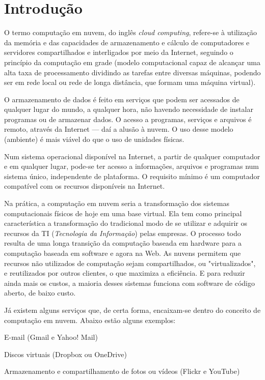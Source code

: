\section{Introdução}

O termo computação em nuvem, do inglês \emph{cloud computing}, refere-se à
utilização da memória e das capacidades de armazenamento e cálculo de
computadores e servidores compartilhados e interligados por meio da Internet,
seguindo o princípio da computação em grade (modelo computacional capaz de
alcançar uma alta taxa de processamento dividindo as tarefas entre diversas
máquinas, podendo ser em rede local ou rede de longa distância, que formam uma
máquina virtual).

O armazenamento de dados é feito em serviços que podem ser acessados de qualquer
lugar do mundo, a qualquer hora, não havendo necessidade de instalar
programas ou de armazenar dados. O acesso a programas, serviços e arquivos é
remoto, através da Internet --- daí a alusão à nuvem. O uso desse modelo (ambiente)
é mais viável do que o uso de unidades físicas.

Num sistema operacional disponível na Internet, a partir de qualquer computador e em
qualquer lugar, pode-se ter acesso a informações, arquivos e programas num sistema
único, independente de plataforma. O requisito mínimo é um computador compatível
com os recursos disponíveis na Internet.

Na prática, a computação em nuvem seria a transformação dos sistemas
computacionais físicos de hoje em uma base virtual. Ela tem como principal
característica a transformação do tradicional modo de se utilizar e adquirir os
recursos da TI (\emph{Tecnologia da Informação}) pelas empresas. O processo todo
resulta de uma longa transição da computação baseada em hardware para a computação
baseada em software e agora na Web. As nuvens permitem que recursos não utilizados
de computação sejam compartilhados, ou "virtualizados", e reutilizados por outros
clientes, o que maximiza a eficiência. E para reduzir ainda mais os custos, a maioria
desses sistemas funciona com software de código aberto, de baixo custo.

Já existem alguns serviços que, de certa forma, encaixam-se dentro do
conceito de computação em nuvem. Abaixo estão alguns exemplos:

\begin{itemise}
    \item E-mail (Gmail e Yahoo! Mail)

    \item Discos virtuais (Dropbox ou OneDrive)

    \item Armazenamento e compartilhamento de fotos ou vídeos (Flickr e YouTube)
\end{itemise}

